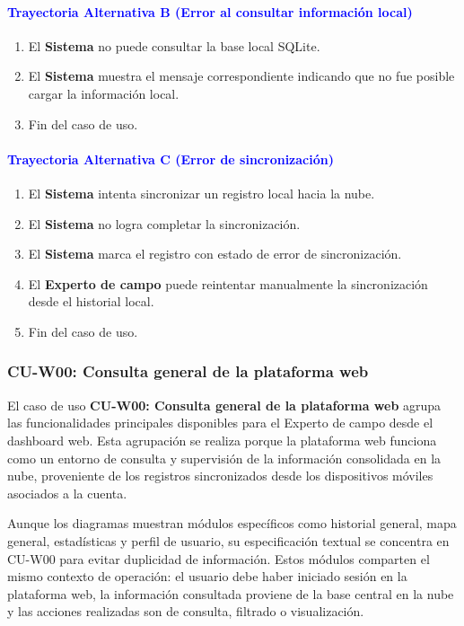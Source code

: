\paragraph{\textbf{\textcolor{blue}{Trayectoria Alternativa B (Error al consultar información local)}}}
\begin{enumerate}
    \item El \textbf{Sistema} no puede consultar la base local SQLite.
    \item El \textbf{Sistema} muestra el mensaje correspondiente indicando que no fue posible cargar la información local.
    \item Fin del caso de uso.
\end{enumerate}

\paragraph{\textbf{\textcolor{blue}{Trayectoria Alternativa C (Error de sincronización)}}}
\begin{enumerate}
    \item El \textbf{Sistema} intenta sincronizar un registro local hacia la nube.
    \item El \textbf{Sistema} no logra completar la sincronización.
    \item El \textbf{Sistema} marca el registro con estado de error de sincronización.
    \item El \textbf{Experto de campo} puede reintentar manualmente la sincronización desde el historial local.
    \item Fin del caso de uso.
\end{enumerate}

\newpage
\subsubsection{        CU-W00: Consulta general de la plataforma web}

El caso de uso \textbf{CU-W00: Consulta general de la plataforma web} agrupa las funcionalidades principales disponibles para el Experto de campo desde el dashboard web. Esta agrupación se realiza porque la plataforma web funciona como un entorno de consulta y supervisión de la información consolidada en la nube, proveniente de los registros sincronizados desde los dispositivos móviles asociados a la cuenta.

Aunque los diagramas muestran módulos específicos como historial general, mapa general, estadísticas y perfil de usuario, su especificación textual se concentra en CU-W00 para evitar duplicidad de información. Estos módulos comparten el mismo contexto de operación: el usuario debe haber iniciado sesión en la plataforma web, la información consultada proviene de la base central en la nube y las acciones realizadas son de consulta, filtrado o visualización.

